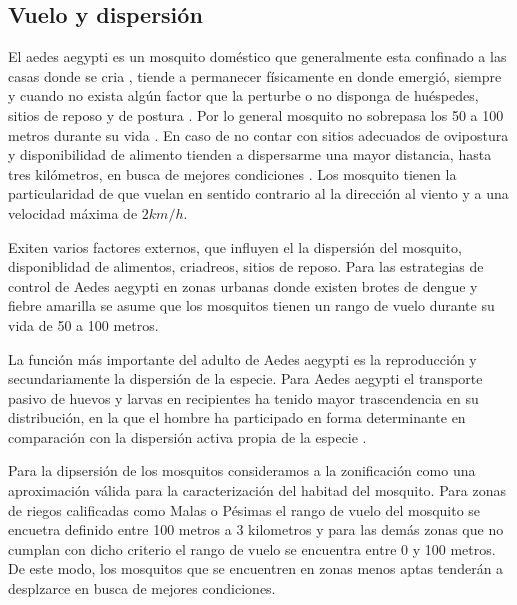 
\subsection{Vuelo y dispersión}
\label{sec:cap4-vuelo-dispersion}
El aedes aegypti es un mosquito doméstico que generalmente esta confinado a las casas donde se
cria \citep{luevano1993ciclo}, tiende a permanecer físicamente en donde emergió, siempre y cuando
no exista algún factor que la perturbe o no disponga de huéspedes, sitios de reposo y de postura
\citep{ThironIzcazaJ2003}. Por lo general mosquito no sobrepasa los 50 a 100 metros durante su vida
\citep{cabezas2005dengue}. En caso de no contar con sitios adecuados de ovipostura y disponibilidad
de alimento tienden a dispersarme una mayor distancia, hasta tres kilómetros, en busca de
mejores condiciones \citep{ThironIzcazaJ2003}. Los mosquito tienen la particularidad de que vuelan
en sentido contrario al la dirección al viento \citep{ThironIzcazaJ2003} y a una velocidad máxima
de $2 km/h$\citep{kaufmann2004flight}.

Exiten varios factores externos, que influyen el la dispersión del mosquito, disponiblidad de
alimentos, criadreos, sitios de reposo. Para las estrategias de control de Aedes aegypti en zonas
urbanas donde existen brotes de dengue y fiebre amarilla se asume que los mosquitos tienen un
rango de vuelo durante su vida de 50 a 100 metros\citep{dengueUruguayCap8}.

La función más importante del adulto de Aedes aegypti es la reproducción y secundariamente la
dispersión de la especie. Para Aedes aegypti el transporte pasivo de huevos y larvas en
recipientes ha tenido mayor trascendencia en su distribución, en la que el hombre ha participado
en forma determinante en comparación con la dispersión activa propia de la especie
\citep{ThironIzcazaJ2003}.

Para la dipsersión de los mosquitos consideramos a la zonificación como una aproximación válida
para la caracterización del habitad del mosquito. Para zonas de riegos calificadas como Malas o
Pésimas el rango de vuelo del mosquito se encuetra definido entre 100 metros a 3 kilometros y para
las demás zonas que no cumplan con dicho criterio el rango de vuelo se encuentra entre 0 y 100
metros. De este modo, los mosquitos que se encuentren en zonas menos aptas tenderán a desplzarce
en busca de mejores condiciones.

